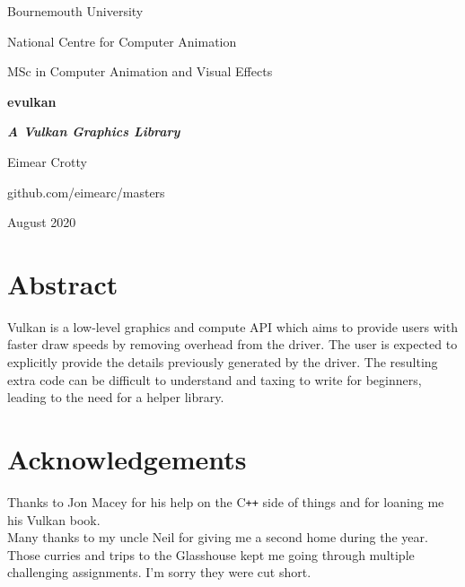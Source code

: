 \documentclass[12pt]{report}
\newcommand{\cpp}{C\texttt{++}}
\theoremstyle{definition}
\begin{document}
  \renewcommand{\familydefault}{\sfdefault}
  \selectfont

  \begin{titlepage}
    \centering
    {\Huge Bournemouth University\par}
    \vspace{0.5cm}
    {\Large National Centre for Computer Animation\par}
    \vspace{0.5cm}
    {\Large MSc in Computer Animation and Visual Effects\par}
    \vspace{5cm}
    {\huge \bfseries evulkan\par}
    \vspace{0.5cm}
    {\Large \bfseries \textit{A Vulkan Graphics Library}\par}
    \vspace{2cm}
    {\Large Eimear Crotty\par}
    \vfill
    {\Large github.com/eimearc/masters\par}
    \vspace{2cm}
    {\Large August 2020}
  \end{titlepage}

  \chapter*{Abstract}
    Vulkan is a low-level graphics and compute API which aims to provide users with faster
    draw speeds by removing overhead from the driver. The user is expected to
    explicitly provide the details previously generated by the driver. The
    resulting extra code can be difficult to understand and taxing to write
    for beginners, leading to the need for a helper library.

  \chapter*{Acknowledgements}

    \vspace{1cm}
    Thanks to Jon Macey for his help on the \cpp{} side of things and for loaning
    me his Vulkan book.\\
    
    Many thanks to my uncle Neil for giving me a second home during the year. Those curries
    and trips to the Glasshouse kept me going through multiple challenging assignments.
    I'm sorry they were cut short. \\
\end{document}
